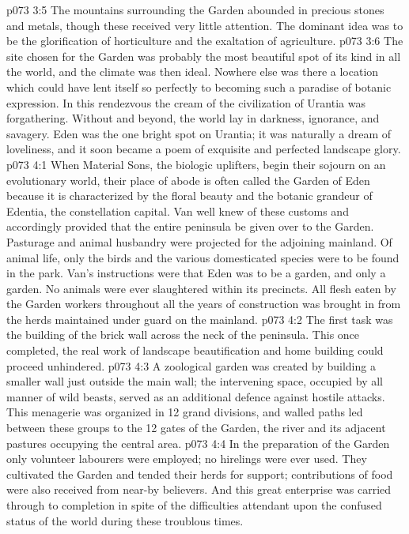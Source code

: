 \vs p073 3:5 The mountains surrounding the Garden abounded in precious stones and metals, though these received very little attention. The dominant idea was to be the glorification of horticulture and the exaltation of agriculture.
\vs p073 3:6 The site chosen for the Garden was probably the most beautiful spot of its kind in all the world, and the climate was then ideal. Nowhere else was there a location which could have lent itself so perfectly to becoming such a paradise of botanic expression. In this rendezvous the cream of the civilization of Urantia was forgathering. Without and beyond, the world lay in darkness, ignorance, and savagery. Eden was the one bright spot on Urantia; it was naturally a dream of loveliness, and it soon became a poem of exquisite and perfected landscape glory.
\vs p073 4:1 When Material Sons, the biologic uplifters, begin their sojourn on an evolutionary world, their place of abode is often called the Garden of Eden because it is characterized by the floral beauty and the botanic grandeur of Edentia, the constellation capital. Van well knew of these customs and accordingly provided that the entire peninsula be given over to the Garden. Pasturage and animal husbandry were projected for the adjoining mainland. Of animal life, only the birds and the various domesticated species were to be found in the park. Van’s instructions were that Eden was to be a garden, and only a garden. No animals were ever slaughtered within its precincts. All flesh eaten by the Garden workers throughout all the years of construction was brought in from the herds maintained under guard on the mainland.
\vs p073 4:2 The first task was the building of the brick wall across the neck of the peninsula. This once completed, the real work of landscape beautification and home building could proceed unhindered.
\vs p073 4:3 A zoological garden was created by building a smaller wall just outside the main wall; the intervening space, occupied by all manner of wild beasts, served as an additional defence against hostile attacks. This menagerie was organized in 12 grand divisions, and walled paths led between these groups to the 12 gates of the Garden, the river and its adjacent pastures occupying the central area.
\vs p073 4:4 In the preparation of the Garden only volunteer labourers were employed; no hirelings were ever used. They cultivated the Garden and tended their herds for support; contributions of food were also received from near\hyp{}by believers. And this great enterprise was carried through to completion in spite of the difficulties attendant upon the confused status of the world during these troublous times.

